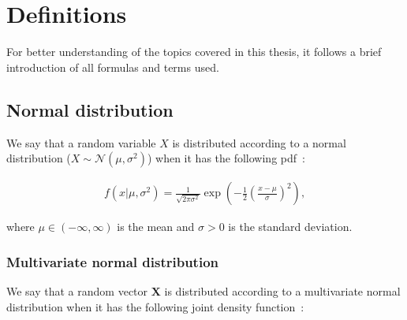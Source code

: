 \chapter{Definitions}\label{ch:definitions}

For better understanding of the topics covered in this thesis,
it follows a brief introduction of all formulas and terms used.


\section{Normal distribution}\label{sec:normal-distribution}

We say that a random variable $X$ is distributed
according to a normal distribution ($X \sim \mathcal{N}(\mu, \sigma^2)$) when it has the following
\gls{pdf}~\autocite[p.59]{izenman_modern_2008}:

\begin{definition}
    \begin{align}
        \label{eq:pdf_normal_dist}
        f(x|\mu, \sigma^2) = \frac{1}{\sqrt{2\pi\sigma^2}}
        \exp{\left(-\frac{1}{2}\left(\frac{x-\mu}{\sigma}\right)^2\right)},
    \end{align}
\end{definition}

where $\mu \in (-\infty, \infty)$ is the mean and $\sigma > 0$ is the standard deviation.

\subsection{Multivariate normal distribution}\label{subsec:multivariate-normal-distribution}

We say that a random vector $\bm{X}$
is distributed according to a multivariate normal distribution
when it has the following joint density function~\autocite[p. 59]{izenman_modern_2008}:

